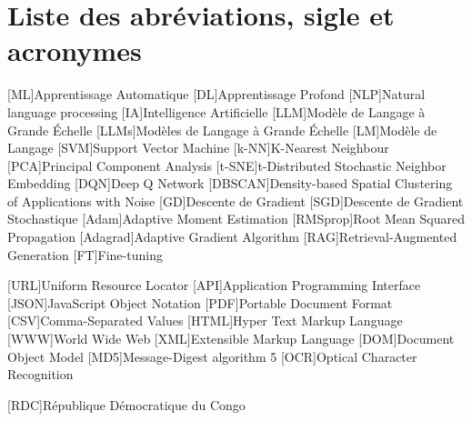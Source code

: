 

\chapter*{Liste des abréviations, sigle et acronymes}

\begin{acronym}[LLM]

[ML]{Apprentissage Automatique}
[DL]{Apprentissage Profond}
[NLP]{Natural language processing}
[IA]{Intelligence Artificielle}
[LLM]{Modèle de Langage à Grande Échelle}
[LLMs]{Modèles de Langage à Grande Échelle}
[LM]{Modèle de Langage}
[SVM]{Support Vector Machine}
[k-NN]{K-Nearest Neighbour}
[PCA]{Principal Component Analysis}
[t-SNE]{t-Distributed Stochastic Neighbor Embedding}
[DQN]{Deep Q Network}
[DBSCAN]{Density-based Spatial Clustering of Applications with Noise}
[GD]{Descente de Gradient}
[SGD]{Descente de Gradient Stochastique}
[Adam]{Adaptive Moment Estimation}
[RMSprop]{Root Mean Squared Propagation}
[Adagrad]{Adaptive Gradient Algorithm}
[RAG]{Retrieval-Augmented Generation}
[FT]{Fine-tuning}

[URL]{Uniform Resource Locator}
[API]{Application Programming Interface}
[JSON]{JavaScript Object Notation}
[PDF]{Portable Document Format}
[CSV]{Comma-Separated Values}
[HTML]{Hyper Text Markup Language}
[WWW]{World Wide Web}
[XML]{Extensible Markup Language}
[DOM]{Document Object Model}
[MD5]{Message-Digest algorithm 5}
[OCR]{Optical Character Recognition}

[RDC]{République Démocratique du Congo}
\end{acronym}  
                   
\endgroup
